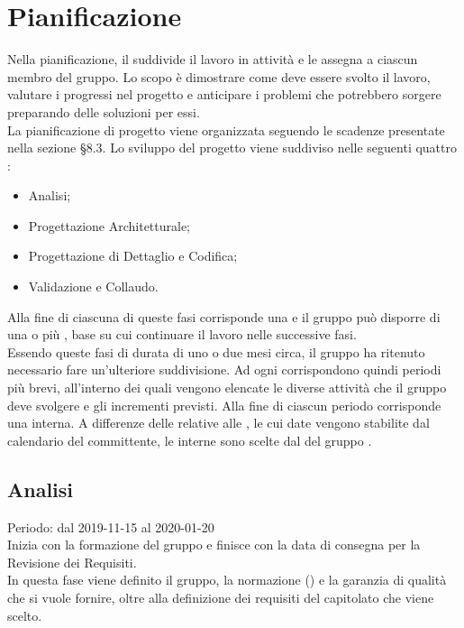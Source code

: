 \section{Pianificazione}
Nella pianificazione, il \Responsabile{} suddivide il lavoro in attività e le assegna a ciascun membro del gruppo.
Lo scopo è dimostrare come deve essere svolto il lavoro, valutare i progressi nel progetto e anticipare i problemi che potrebbero sorgere preparando delle soluzioni per essi.\\
La pianificazione di progetto viene organizzata seguendo le scadenze presentate nella sezione §8.3.
Lo sviluppo del progetto viene suddiviso nelle seguenti quattro : 
\begin{itemize}
	\item Analisi;
	\item Progettazione Architetturale;
	\item Progettazione di Dettaglio e Codifica;
	\item Validazione e Collaudo.
\end{itemize}
Alla fine di ciascuna di queste fasi corrisponde una  e il gruppo può disporre di una o più , base su cui continuare il lavoro nelle successive fasi.\\
Essendo queste fasi di durata di uno o due mesi circa, il gruppo ha ritenuto necessario fare un'ulteriore suddivisione. Ad ogni  corrispondono quindi periodi più brevi, all'interno dei quali vengono elencate le diverse attività che il gruppo \Gruppo{} deve svolgere e gli incrementi previsti.
Alla fine di ciascun periodo corrisponde una  interna. A differenze delle  relative alle , le cui date vengono stabilite dal calendario del committente, le  interne sono scelte dal \Responsabile{} del gruppo \Gruppo{}.

\subsection{Analisi}
Periodo: dal 2019-11-15 al 2020-01-20\\
Inizia con la formazione del gruppo e finisce con la data di consegna per la Revisione dei Requisiti.\\
In questa fase viene definito il gruppo, la normazione () e la garanzia di qualità che si vuole fornire, oltre alla definizione dei requisiti del capitolato che viene scelto.

